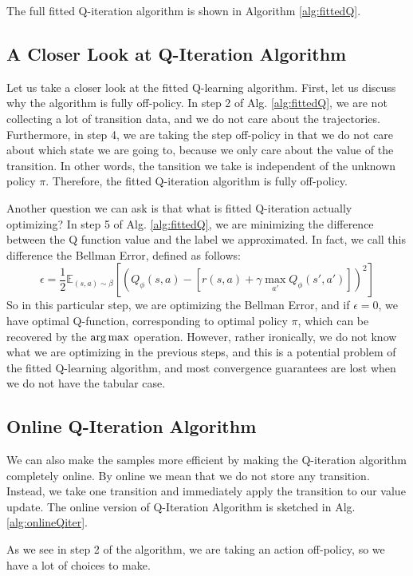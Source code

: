 The full fitted Q-iteration algorithm is shown in Algorithm \ref{alg:fittedQ}.

\subsection{A Closer Look at Q-Iteration Algorithm}
Let us take a closer look at the fitted Q-learning algorithm. 
First, let us discuss why the algorithm is fully off-policy. In step 2 of Alg. \ref{alg:fittedQ}, we are not collecting a lot of transition data, and we do not care about the trajectories. Furthermore, in step 4, we are taking the step off-policy in that we do not care about which state we are going to, because we only care about the value of the transition. In other words, the tansition we take is independent of the unknown policy $\pi$. Therefore, the fitted Q-iteration algorithm is fully off-policy.

Another question we can ask is that what is fitted Q-iteration actually optimizing? In step 5 of Alg. \ref{alg:fittedQ}, we are minimizing the difference between the Q function value and the label we approximated. In fact, we call this difference the Bellman Error, defined as follows:
$$\epsilon = \frac{1}{2}\mathbb{E}_{(s,a)\sim\beta}\left[\left(Q_\phi(s,a) - \left[r(s,a)+\gamma\max_{a'}Q_\phi(s',a')\right]\right)^2\right]$$
So in this particular step, we are optimizing the Bellman Error, and if $\epsilon = 0$, we have optimal Q-function, corresponding to optimal policy $\pi$, which can be recovered by the $\operatorname*{arg\,max}$ operation. However, rather ironically, we do not know what we are optimizing in the previous steps, and this is a potential problem of the fitted Q-learning algorithm, and most convergence guarantees are lost when we do not have the tabular case.

\subsection{Online Q-Iteration Algorithm}
We can also make the samples more efficient by making the Q-iteration algorithm completely online. By online we mean that we do not store any transition. Instead, we take one transition and immediately apply the transition to our value update. The online version of Q-Iteration Algorithm is sketched in Alg. \ref{alg:onlineQiter}.

As we see in step 2 of the algorithm, we are taking an action off-policy, so we have a lot of choices to make. 

